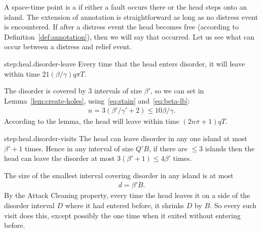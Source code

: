 \documentclass[11pt]{memoir}
\theoremstyle{definition} %
\renewcommand{\le}{\leq}
\def\B{B}
\newcommand{\escno}{q}
\newcommand{\passno}{\pi}
\newcommand{\Q}{Q} %
\newcommand{\Tu}{T}
\newcommand{\cns}[1]{c_{\textrm{\upshape #1}}}
\newcommand{\CSpill}{\cns{spill}}
\begin{document}
\begin{Proof}
  A space-time point is a  if either a
  fault occurs there or the head steps onto an island.
The extension of annotation is straightforward as long as no distress event is encountered.
If after a distress event the head becomes free (according to Definition~\ref{def:annotation}),
then we will say that  occurred.
Let us see what can occur between a distress and relief event.

\begin{step+}{step:heal.disorder-leave}
  Every time that the head enters disorder, it will leave within time
  \(  21(\beta/\gamma)\escno\passno\Tu \).
\end{step+}
\begin{pproof}
  The disorder is covered by 3 intervals of size \( \beta' \),
  so we can set in Lemma~\ref{lem:create-holes}, using~\eqref{eq:stain} and~\eqref{eq:beta-lb}:
\begin{align*}
  n= 3(\beta'/\gamma' + 2) %
  \le 10\beta/\gamma.
\end{align*}
According to the lemma, the head will leave within time
\( (2 n\passno + 1)\escno\Tu \).
\end{pproof} %

\begin{step+}{step:heal.disorder-visits}
  The head can leave disorder in any one island at most \( \beta'+1 \) times.
  Hence in any interval of size \( \Q'\B \), if there are \( \le 3 \) islands
  then the head can leave the disorder at most \( 3(\beta'+1)\le 4\beta' \) times.
\end{step+}
\begin{pproof}
The size of the smallest interval covering disorder in any island is at most 
\begin{align*}
 d=\beta'\B .
\end{align*}
By the Attack Cleaning property, every time the head leaves it on a side of the disorder
interval \( D \) where it had entered before, it shrinks \( D \) by \( \B \).
So every such visit does this, except possibly the one time
when it exited without entering before.
\end{pproof}


\end{Proof}
\end{document}
